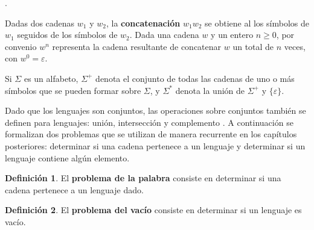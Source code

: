 \documentclass{article}
\theoremstyle{definition}
\newtheorem{definicion}{Definición}
\theoremstyle{plain}
\theoremstyle{remark}
\begin{document}
.

Dadas dos cadenas $w_1$ y $w_2$, la \textbf{concatenación} $w_1 w_2$
se obtiene al  los símbolos de $w_1$ seguidos de los símbolos
de $w_2$. Dada una cadena $w$ y un entero $n \ge 0$, por convenio
$w^n$ representa la cadena resultante de concatenar $w$ un total de
$n$ veces, con $w^0 = \varepsilon$.

Si $\Sigma$ es un alfabeto, $\Sigma^+$ denota el conjunto de todas las
cadenas de uno o más símbolos que se pueden formar sobre $\Sigma$, y
$\Sigma^*$ denota la unión de $\Sigma^+$ y $\{\varepsilon\}$.

Dado que los lenguajes son conjuntos, las operaciones sobre conjuntos
también se definen para lenguajes: unión, intersección y complemento
\cite{hopcroft2006introduction}. A continuación se formalizan dos
problemas que se utilizan de manera recurrente en los capítulos
posteriores: determinar si una cadena pertenece a un lenguaje y
determinar si un lenguaje contiene algún elemento.

\begin{definicion}
  El \textbf{problema de la palabra} consiste en determinar si una cadena
  pertenece a un lenguaje dado.
\end{definicion}


\begin{definicion}
  El \textbf{problema del vacío} consiste en determinar si un lenguaje
  es vacío.
\end{definicion}
\end{document}
